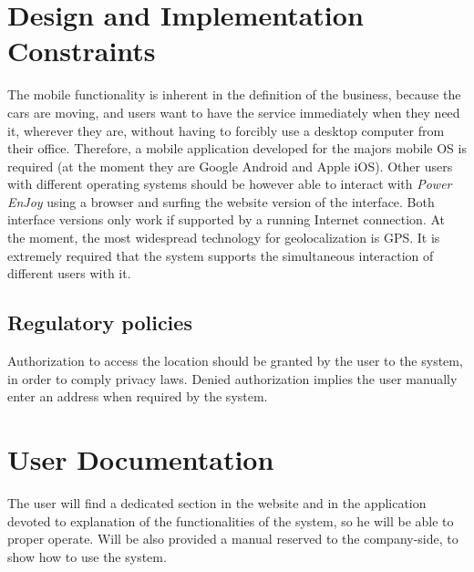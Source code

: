\documentclass{scrreprt}
\begin{document}
\section{Design and Implementation Constraints}
The mobile functionality is inherent in the definition of the business, because the cars are moving, and users want to have the service immediately when they need it, wherever they are, without having to forcibly use a desktop computer from their office. Therefore, a mobile application developed for the majors mobile OS is required (at the moment they are Google Android and Apple iOS). Other users with different operating systems should be however able to interact with \emph{Power EnJoy} using a browser and surfing the website version of the interface.
Both interface versions only work if supported by a running Internet connection.
At the moment, the most widespread technology for geolocalization is GPS.
It is extremely required that the system supports the simultaneous interaction of different users with it.

\subsection{Regulatory policies}
Authorization to access the location should be granted by the user to the system, in order to comply privacy laws. Denied authorization implies the user manually enter an address when required by the system.

\begin{comment}$<$Describe any items or issues that will limit the options available to the 
developers. These might include: corporate or regulatory policies; hardware 
limitations (timing requirements, memory requirements); interfaces to other 
applications; specific technologies, tools, and databases to be used; parallel 
operations; language requirements; communications protocols; security 
considerations; design conventions or programming standards (for example, if the 
user's organization will be responsible for maintaining the delivered software).$>$
\end{comment}

\section{User Documentation}
The user will find a dedicated section in the website and in the application devoted to explanation of the functionalities of the system, so he will be able to proper operate.
Will be also provided a manual reserved to the company-side, to show how to use the system.
\begin{comment}$<$List the user documentation components (such as user manuals, on-line help, 
and tutorials) that will be delivered along with the software. Identify any 
known user documentation delivery formats or standards.$>$
\end{comment}
\end{document}

